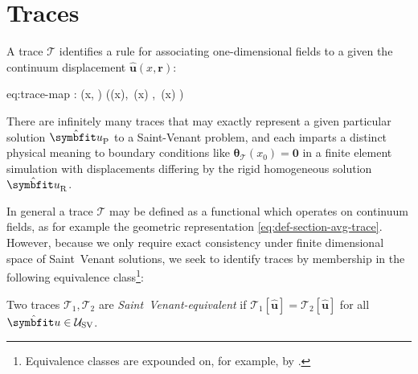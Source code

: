 \section{Traces}\label{sec:trace}

A trace $\mathcal{T}$ identifies 
a rule for associating one-dimensional fields to a given the continuum displacement \(\hat{\bm u}(x,\bm{r})\):
\begin{SaveEquation}{eq:trace-map}
: (x, ) \;\longmapsto\; 
\Big((x),\, \bm{\theta}(x)
,\, \bm{\alpha}(x)
\Big)
\end{SaveEquation}

There are infinitely many traces that may exactly represent a given particular solution \(\hat{\bm u}_{\rm P}\) to a Saint-Venant problem, and each imparts a distinct physical meaning to boundary conditions like \(\bm{\theta}_{\mathcal{T}}(x_0) = \mathbf{0}\) in a finite element simulation with displacements differing by the rigid homogeneous solution \(\hat{\bm u}_{\rm R}\). 

In general a trace \(\mathcal{T}\) may be defined as a functional which operates on continuum fields, as for example the geometric representation \eqref{eq:def-section-avg-trace}. 
However, because we only require exact consistency under finite dimensional space of Saint~Venant solutions, we seek to identify traces by membership in the following equivalence class\footnote{Equivalence classes are expounded on, for example, by \cite{halmos1974finitedimensional}.}:

\begin{definition}
\label{def:sv-equivalence}
Two traces $\mathcal T_1,\mathcal T_2$ are \emph{Saint~Venant-equivalent} if
$\mathcal T_1[\hat{\bm u}]=\mathcal T_2[\hat{\bm u}]$ for all $\hat{\bm u}\in\mathcal U_{\rm SV}$.
\end{definition}

